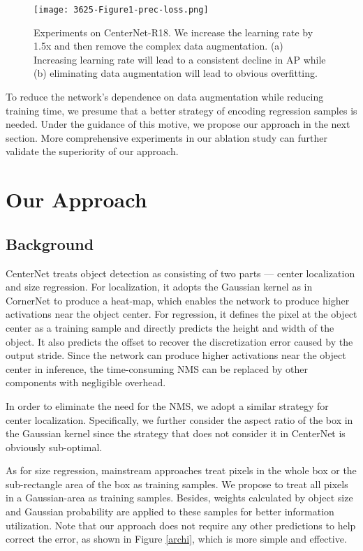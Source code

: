 \documentclass[letterpaper]{article} \usepackage{aaai20}  \usepackage{times}  \usepackage{helvet} \usepackage{courier}  \usepackage[hyphens]{url}  \usepackage{graphicx} \urlstyle{rm} \def\UrlFont{\rm}  \usepackage{graphicx}  \frenchspacing  \setlength{\pdfpagewidth}{8.5in}  \setlength{\pdfpageheight}{11in}  \usepackage{subcaption}
\begin{document}
\begin{figure}[!t]
\centering
\texttt{[image: 3625-Figure1-prec-loss.png]}
\caption{Experiments on CenterNet-R18. We increase the learning rate by 1.5x and then remove the complex data augmentation. (a) Increasing learning rate will lead to a consistent decline in AP while (b) eliminating data augmentation will lead to obvious overfitting.}
\label{centernet}
\end{figure}

To reduce the network's dependence on data augmentation while reducing training time, we presume that a better strategy of encoding regression samples is needed. Under the guidance of this motive, we propose our approach in the next section. More comprehensive experiments in our ablation study can further validate the superiority of our approach.


\section{Our Approach}
\subsection{Background}

CenterNet treats object detection as consisting of two parts --- center localization and size regression. For localization, it adopts the Gaussian kernel as in CornerNet to produce a heat-map, which enables the network to produce higher activations near the object center. For regression, it defines the pixel at the object center as a training sample and directly predicts the height and width of the object. It also predicts the offset to recover the discretization error caused by the output stride. Since the network can produce higher activations near the object center in inference, the time-consuming NMS can be replaced by other components with negligible overhead.

In order to eliminate the need for the NMS, we adopt a similar strategy for center localization. Specifically, we further consider the aspect ratio of the box in the Gaussian kernel since the strategy that does not consider it in CenterNet is obviously sub-optimal. 

As for size regression, mainstream approaches treat pixels in the whole box \cite{DBLP:journals/corr/abs-1904-01355} or the sub-rectangle area of the box \cite{DBLP:journals/corr/abs-1904-03797} as training samples. We propose to treat all pixels in a Gaussian-area as training samples. Besides, weights calculated by object size and Gaussian probability are applied to these samples for better information utilization. Note that our approach does not require any other predictions to help correct the error, as shown in Figure \ref{archi}, which is more simple and effective.
\end{document}

